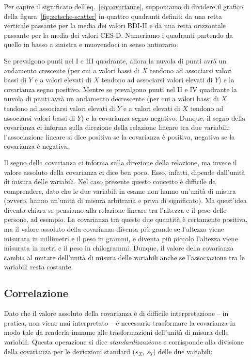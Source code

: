 \documentclass[
  10pt,
  italian,
  a4paper,
  extrafontsizes,onecolumn,openright
  ]{memoir}
\theoremstyle{definition}
\theoremstyle{definition}
\theoremstyle{definition}
\theoremstyle{definition}
\theoremstyle{remark}
\begin{document}
Per capire il significato dell'eq.~\eqref{eq:covariance}, supponiamo di dividere il grafico della figura~\ref{fig:zetsche-scatter} in quattro quadranti definiti da una retta verticale passante per la media dei valori BDI-II e da una retta orizzontale passante per la media dei valori CES-D. Numeriamo i quadranti partendo da quello in basso a sinistra e muovendoci in senso antiorario.

Se prevalgono punti nel I e III quadrante, allora la nuvola di punti
avrà un andamento crescente (per cui a valori bassi di \(X\) tendono ad
associarsi valori bassi di \(Y\) e a valori elevati di \(X\) tendono ad
associarsi valori elevati di \(Y\)) e la covarianza segno positivo. Mentre
se prevalgono punti nel II e IV quadrante la nuvola di punti avrà un
andamento decrescente (per cui a valori bassi di \(X\) tendono ad
associarsi valori elevati di \(Y\) e a valori elevati di \(X\) tendono ad
associarsi valori bassi di \(Y\)) e la covarianza segno negativo. Dunque,
il segno della covarianza ci informa sulla direzione della relazione
lineare tra due variabili: l'associazione lineare si dice positiva se la
covarianza è positiva, negativa se la covarianza è negativa.

Il segno della covarianza ci informa sulla direzione della relazione, ma
invece il valore assoluto della covarianza ci dice ben poco. Esso,
infatti, dipende dall'unità di misura delle variabili. Nel caso presente
questo concetto è difficile da comprendere, dato che le due variabili in
esame non hanno un'unità di misura (ovvero, hanno un'unità di misura
arbitraria e priva di significato). Ma quest'idea diventa chiara se
pensiamo alla relazione lineare tra l'altezza e il peso delle persone,
ad esempio. La covarianza tra queste due quantità è certamente positiva,
ma il valore assoluto della covarianza diventa più grande se l'altezza
viene misurata in millimetri e il peso in grammi, e diventa più piccolo
l'altezza viene misurata in metri e il peso in chilogrammi. Dunque, il
valore della covarianza cambia al mutare dell'unità di misura delle
variabili anche se l'associazione tra le variabili resta costante.

\hypertarget{correlazione}{%
\subsection{Correlazione}\label{correlazione}}

Dato che il valore assoluto della covarianza è di difficile
interpretazione -- in pratica, non viene mai interpretato -- è
necessario trasformare la covarianza in modo tale da renderla immune
alle trasformazioni dell'unità di misura delle variabili. Questa
operazione si dice \emph{standardizzazione} e corrisponde alla divisione
della covarianza per le deviazioni standard (\(s_X\), \(s_Y\)) delle due
variabili:
\end{document}
